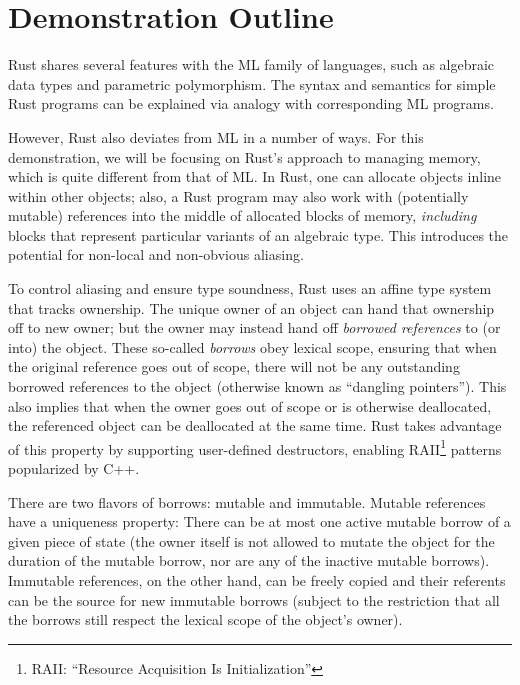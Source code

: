 \documentclass{acm_proc_article-sp}
\begin{document}
\section{Demonstration Outline}

Rust shares several features with the ML family of languages,
such as algebraic data types and parametric polymorphism.  The syntax
and semantics for simple Rust programs can be explained via
analogy with corresponding ML programs.

However, Rust also deviates from ML in a number of ways.  For this
demonstration, we will be focusing on Rust's approach to managing
memory, which is quite different from that of ML.
In Rust, one can allocate objects inline within other objects; also, a
Rust program may also work with (potentially mutable) references into the
middle of allocated blocks of memory, \emph{including} blocks that represent
particular variants of an algebraic type.
%
This introduces the potential for non-local and non-obvious aliasing.

To control aliasing and ensure type soundness, Rust uses an affine
type system that tracks ownership.  The unique owner of an object can
hand that ownership off to new owner; but the owner may instead hand
off {\em borrowed references} to (or into) the object.  These
so-called \emph{borrows} obey lexical scope, ensuring that when the
original reference goes out of scope, there will not be any
outstanding borrowed references to the object (otherwise known as
``dangling pointers'').  This also implies that when the owner goes
out of scope or is otherwise deallocated, the referenced object can be
deallocated at the same time. Rust takes advantage of this property by
supporting user-defined destructors, enabling RAII\footnote{%
RAII: ``Resource Acquisition Is Initialization''}
patterns popularized by C++.

There are two flavors of borrows: mutable and immutable.
Mut\-able references have a uniqueness property:
There can be at
most one active mutable borrow of a given piece of state (the owner
itself is not allowed to mutate the object for the duration of the
mutable borrow, nor are any of the inactive mutable borrows).
Immutable references, on the other hand,
can be freely copied and their referents can be the source for new
immutable borrows (subject to the restriction that all the borrows
still respect the lexical scope of the object's owner).
\end{document}
